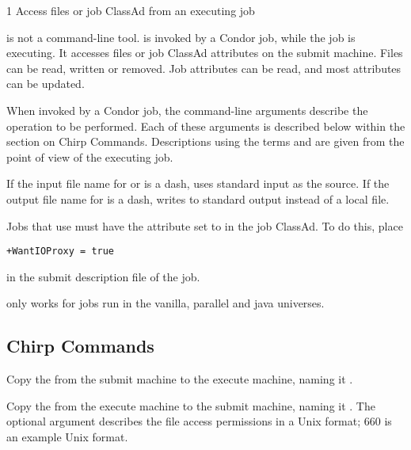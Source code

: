 \begin{ManPage}{\label{man-condor-chirp}}{1}
{Access files or job ClassAd from an executing job}
\Synopsis
{}

\Description 
{}
 is not a command-line tool.
 is invoked by a Condor job, while the job is executing.
It accesses files or job ClassAd attributes on the submit machine.
Files can be read, written or removed.
Job attributes can be read, and most attributes can be updated.

When invoked by a Condor job,
the command-line arguments describe the operation to be performed. 
Each of these arguments is described below within the section
on Chirp Commands.
Descriptions using the terms  and 
are given from the point of view of the executing job.

If the input file name for  or  is a dash,
 uses standard input as the source.
If the output file name for  is a dash,
 writes to standard output instead of a local file.

Jobs that use  must have the attribute
 set to  in the job ClassAd.
To do this, place
\begin{verbatim}
+WantIOProxy = true
\end{verbatim}
in the submit description file of the job.

 only works for jobs run in the
vanilla, parallel and java universes.

\subsection*{Chirp Commands}
\begin{description}

    {Copy the  from the submit machine
    to the execute machine, naming it .}
    {Copy the  from the execute machine
    to the submit machine, naming it .
    The optional  argument describes the file access
    permissions in a Unix format; 660 is an example Unix format.

}
\end{description}
\end{ManPage}
